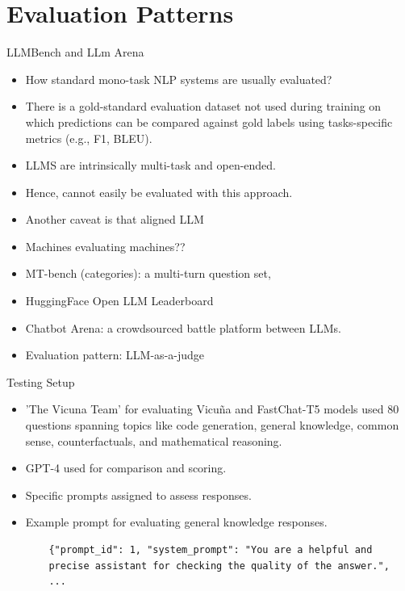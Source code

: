 \documentclass[handout]{beamer}
\begin{document}
\section{Evaluation Patterns}
\begin{frame}{LLMBench and LLm Arena}
\begin{scriptsize}
\begin{itemize}
\item How standard mono-task NLP systems are usually evaluated?
\item There is a gold-standard evaluation dataset not used during training on which predictions can be compared against gold labels using tasks-specific metrics (e.g., F1, BLEU).
\item LLMS are intrinsically multi-task and open-ended.
\item Hence, cannot easily be evaluated with this approach.
\item Another caveat is that aligned LLM
\item Machines evaluating machines??
\item MT-bench (categories): a multi-turn question set,
\item HuggingFace Open LLM Leaderboard
\item Chatbot Arena: a crowdsourced battle platform between LLMs.
\item Evaluation pattern: LLM-as-a-judge
\end{itemize}
\end{scriptsize}
\end{frame}



\begin{frame}[fragile]{Testing Setup}
  \begin{itemize}
    \item'The Vicuna Team' for evaluating Vicuña and FastChat-T5 models used 80 questions spanning topics like code generation, general knowledge, common sense, counterfactuals, and mathematical reasoning.
    \item GPT-4 used for comparison and scoring.
    \item Specific prompts assigned to assess responses.
    \item Example prompt for evaluating general knowledge responses.
    \begin{scriptsize}
    \begin{verbatim}
    {"prompt_id": 1, "system_prompt": "You are a helpful and
    precise assistant for checking the quality of the answer.",
    ...
    \end{verbatim}
    \end{scriptsize}
  \end{itemize}
\end{frame}
\end{document}
